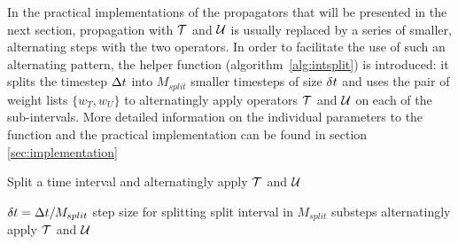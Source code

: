 %
In the practical implementations of the propagators that will be presented in the next section, propagation with $\mathcal{T}$ and $\mathcal{U}$ is usually replaced by a series of smaller, alternating steps with the two operators.
In order to facilitate the use of such an alternating pattern, the helper function  (algorithm~\ref{alg:intsplit}) is introduced:
it splits the timestep $\Delta t$ into $M_{split}$ smaller timesteps of size $\delta t$ and uses the pair of weight lists $\{ w_T, w_U \}$ to alternatingly apply operators $\mathcal{T}$ and $\mathcal{U}$ on each of the sub-intervals.
More detailed information on the individual parameters to the  function and the practical implementation can be found in section \ref{sec:implementation}
%
\begin{algorithm}[ht]
	\caption{Split a time interval and alternatingly apply $\mathcal{T}$ and $\mathcal{U}$}
	\label{alg:intsplit}
	\begin{algorithmic}
		\State
			\State
			\State $\delta t = \Delta t/M_{split}$
			\Comment step size for splitting
			\Comment split interval in $M_{split}$ substeps
				\Comment alternatingly apply $\mathcal{T}$ and $\mathcal{U}$
					\State {}
					\State {}
				\EndFor
			\EndFor
		\State
		\EndProcedure
	\end{algorithmic}
\end{algorithm}


